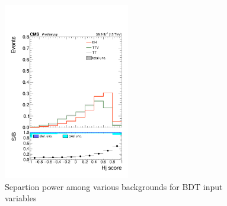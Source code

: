 \begin{figure}[htp]
\includegraphics[width=0.49\textwidth]{ch9_figs/kinMVA_input_BDTv8_eventReco_Hj_score.pdf}
\caption[Signal extraction BDT input variables]{Separtion power among various backgrounds for BDT input variables}
\label{fig:inputs2}
\end{figure}

